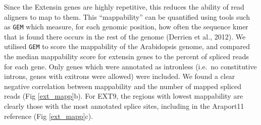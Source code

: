 \documentclass[12pt,a4paper,]{report}
\begin{document}
\newpage

Since the Extensin genes are highly repetitive, this reduces the ability
of read aligners to map to them. This ``mappability'' can be quantified
using tools such as \texttt{GEM} which measure, for each genomic
position, how often the sequence kmer that is found there occurs in the
rest of the genome (Derrien et al., 2012). We utilised \texttt{GEM} to
score the mappability of the Arabidopsis genome, and compared the median
mappability score for extensin genes to the percent of spliced reads for
each gene. Only genes which were annotated as intronless (i.e.~no
constitutive introns, genes with exitrons were allowed) were included.
We found a clear negative correlation between mappability and the number
of mapped spliced reads (Fig \ref{ext_mapp}b). For EXT9, the regions
with lowest mappability are clearly those with the most annotated splice
sites, including in the Araport11 reference (Fig \ref{ext_mapp}c).

\newpage
\end{document}
